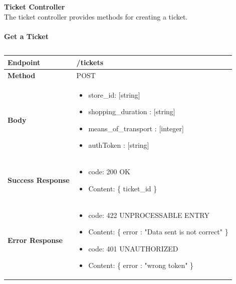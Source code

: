 \documentclass[a4paper, 12pt, oneside, table]{article}
\begin{document}
\textbf{\large Ticket Controller}\\
The ticket controller provides methods for creating a ticket.\\
\\
\textbf{Get a Ticket}
\vspace{-2em}
\begin{tabularx}{0.8\textwidth} { 
  | >{\raggedright\arraybackslash}X 
  | >{\centering\arraybackslash}X 
  | >{\raggedleft\arraybackslash}X | }
 \hline

 \hline
 
\hline
\hline
 
\hline
\end{tabularx}

\begin{tabularx}{\linewidth}{| l | X |}
    
    \hline
     \textbf{Endpoint} & /tickets \\
    

    \hline
    \textbf{Method}  & POST   \\
    
    \hline
    \textbf{Body}  & \parbox{0.7\textwidth}{ \begin{itemize}[label={}] 
                \item store\_id: [string]
                 \item shopping\_duration : [string]
                 \item means\_of\_transport : [integer]
                 \item authToken : [string]
               \end{itemize}}\\
    
    \hline
    \textbf{Success Response} & \parbox{0.7\textwidth}{ \begin{itemize}[label={}] 
                \item code: 200 OK
                 \item Content: \{ ticket\_id \}
               \end{itemize}}\\
    
    \hline
    
    \hline
        \textbf{Error Response} & \parbox{0.7\textwidth}{ \begin{itemize}[label={}] 
                \item code: 422 UNPROCESSABLE ENTRY
                 \item Content: \{ error : "Data sent is not correct" \}
                  \item code: 401 UNAUTHORIZED
                 \item Content: \{ error : "wrong token" \}
               \end{itemize}}\\
    

\end{tabularx}
\end{document}
